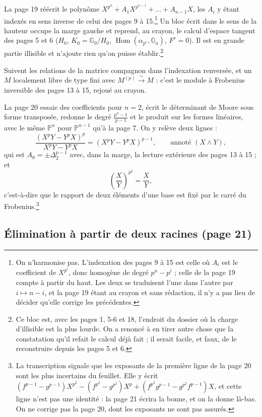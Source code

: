 \documentclass[11pt,a4paper]{article}
\begin{document}
La page 19 réécrit le polynôme $X^{p^n} + A_1 X^{p^{n-1}} + \dots +
A_{n-1}X$, les $A_i$ y étant indexés en sens inverse de celui des pages 9 à
15.\footnote{On n'harmonise pas. L'indexation des pages 9 à 15 est celle où
$A_i$ est le coefficient de $X^{p^i}$, donc homogène de degré $p^n - p^i$ ;
celle de la page 19 compte à partir du haut. Les deux se traduisent l'une
dans l'autre par $i \mapsto n - i$, et la page 19 étant au crayon et sans
rédaction, il n'y a pas lieu de décider qu'elle corrige les précédentes.} Un
bloc écrit dans le sens de la hauteur occupe la marge gauche et reprend, au
crayon, le calcul d'espace tangent des pages 5 et 6 ($H_0$, $K_0 =
\mathbb{G}_0/H_0$, $\operatorname{Hom}(\alpha_{p^r}, \mathbb{G}_a)$, $F^r =
0$). Il est en grande partie illisible et n'ajoute rien qu'on puisse
établir.\footnote{Ce bloc est, avec les pages 1, 5-6 et 18, l'endroit du
dossier où la charge d'illisible est la plus lourde. On a renoncé à en tirer
autre chose que la constatation qu'il refait le calcul déjà fait ; il serait
facile, et faux, de le reconstruire depuis les pages 5 et 6.}

Suivent les relations de la matrice compagnon dans l'indexation renversée,
et un $M$ localement libre de type fini avec $M^{(p)} \xrightarrow{\ \sim\ }
M$ : c'est le module à Frobenius inversible des pages 13 à 15, rejoué au
crayon.

La page 20 essaie des coefficients pour $n = 2$, écrit le déterminant de
Moore sous forme transposée, redonne le degré $\frac{p^n-1}{p-1}$ et le
produit sur les formes linéaires, avec le même $\mathbb{P}^n$ pour
$\mathbb{P}^{n-1}$ qu'à la page 7. On y relève deux lignes :
\[
  \frac{(X^p Y - Y^p X)^p}{X^p Y - Y^p X} = (X^p Y - Y^p X)^{p-1},
  \qquad \text{annoté } (X \wedge Y) ,
\]
qui est $A_0 = \pm\Delta_2^{p-1}$ avec, dans la marge, la lecture
extérieure des pages 13 à 15 ; et
\[
  \left(\frac{X}{Y}\right)^{p^2} = \frac{X}{Y} ,
\]
c'est-à-dire que le rapport de deux éléments d'une base est fixé par le carré
du Frobenius.\footnote{La transcription signale que les exposants de la
première ligne de la page 20 sont les plus incertains du feuillet. Elle y
écrit $(f^{p-1} - g^{p-1})X^{p^2} - (f^{p^2} - g^{p^2})X^p + (f^{p^2}g^{p-1}
- g^{p^2}f^{p-1})X$, et cette ligne n'est pas une identité : la page 21
écrira la bonne, et on la donne là-bas. On ne corrige pas la page 20, dont
les exposants ne sont pas assurés.}

\subsection*{Élimination à partir de deux racines (page 21)}
\end{document}
